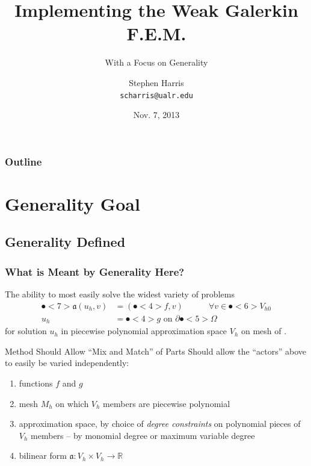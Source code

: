 \documentclass[compress]{beamer}
\title[Implementing WGFEM]{Implementing the Weak Galerkin F.E.M.}
\subtitle{With a Focus on Generality}
\author{Stephen Harris \\ \texttt{scharris@ualr.edu}}
\date{Nov. 7, 2013}
\begin{document}
\begin{frame}
  \titlepage
\end{frame}

\begin{frame}
  \frametitle{Outline}
  \tableofcontents[pausesections]
\end{frame}

\section{Generality Goal}
\subsection{Generality Defined}

\begin{frame}
  \frametitle{What is Meant by Generality Here?}
  \pause
  The ability to most easily solve the widest variety of problems
    \begin{align*}
      \spot<7>{\mathfrak{a}}(u_h,v) & = (\spot<4>{f},v)\quad\quad\quad \forall{v} \in \spot<6>{V_{h0}} \\
      u_h & = \spot<4>{g} \text{ on } \partial\spot<5>{\Omega}
    \end{align*}
    for solution $u_h$ in piecewise polynomial approximation space $V_h$ on mesh  of .
  \pause

  \begin{block}{Method Should Allow ``Mix and Match'' of Parts}
    Should allow the ``actors'' above to easily be varied independently:
    \pause
    \begin{enumerate}[<+->]
      \item functions $f$ and $g$
      \item mesh $M_h$ on which $V_h$ members are piecewise polynomial
      \item approximation space, by choice of \emph{degree constraints} on polynomial pieces of $V_h$ members -- by monomial degree or maximum variable degree
      \item bilinear form $\mathfrak{a}: V_h \times V_h \rightarrow \mathbb{R}$
    \end{enumerate}
  \end{block}

\end{frame}
\end{document}

